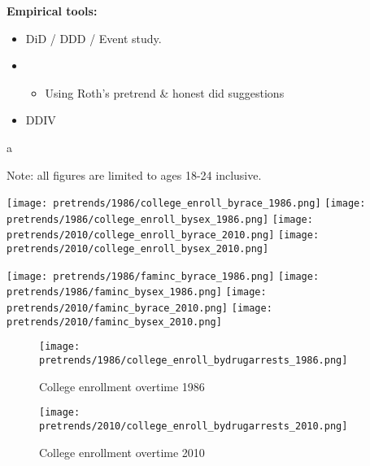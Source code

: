 \documentclass{article}
\begin{document}
\textbf{Empirical tools:}
\begin{itemize}[itemsep=0.05mm, parsep=0pt]
  \item DiD / DDD / Event study.
  \item \begin{itemize}
    \item Using Roth's pretrend \& honest did suggestions
  \end{itemize}
  \item DDIV
\end{itemize}


\clearpage
\nocite{*}
\singlespacing



a
\clearpage

Note: all figures are limited to ages 18-24 inclusive.

\begin{center}
  \texttt{[image: pretrends/1986/college\_enroll\_byrace\_1986.png]}
  \texttt{[image: pretrends/1986/college\_enroll\_bysex\_1986.png]}
  \texttt{[image: pretrends/2010/college\_enroll\_byrace\_2010.png]}
  \texttt{[image: pretrends/2010/college\_enroll\_bysex\_2010.png]}
\end{center}

\clearpage

\begin{center}
  \texttt{[image: pretrends/1986/faminc\_byrace\_1986.png]}
  \texttt{[image: pretrends/1986/faminc\_bysex\_1986.png]}
  \texttt{[image: pretrends/2010/faminc\_byrace\_2010.png]}
  \texttt{[image: pretrends/2010/faminc\_bysex\_2010.png]}
\end{center}

\clearpage

\begin{figure}[h]
  \caption{College enrollment overtime 1986}
  \centering
  \texttt{[image: pretrends/1986/college\_enroll\_bydrugarrests\_1986.png]}
  \label{fig:TBD}
\end{figure}

\clearpage

\begin{figure}[h]
  \caption{College enrollment overtime 2010}
  \centering
  \texttt{[image: pretrends/2010/college\_enroll\_bydrugarrests\_2010.png]}
  \label{fig:TBD}
\end{figure}
\end{document}
